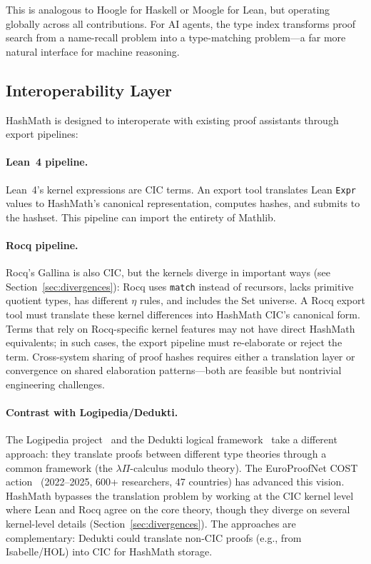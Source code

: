 \documentclass[11pt]{article}
\theoremstyle{definition}
\theoremstyle{plain}
\theoremstyle{remark}
\begin{document}
This is analogous to Hoogle for Haskell or Moogle for Lean, but operating globally across
all contributions.
For AI agents, the type index transforms proof search from a name-recall problem into a
type-matching problem---a far more natural interface for machine reasoning.

\subsection{Interoperability Layer}
\label{sec:interop}

HashMath is designed to interoperate with existing proof assistants through export pipelines:

\paragraph{Lean~4 pipeline.}
Lean~4's kernel expressions are CIC terms.
An export tool translates Lean \texttt{Expr} values to HashMath's canonical representation,
computes hashes, and submits to the hashset.
This pipeline can import the entirety of Mathlib.

\paragraph{Rocq pipeline.}
Rocq's Gallina is also CIC, but the kernels diverge in important ways
(see Section~\ref{sec:divergences}): Rocq uses \texttt{match} instead of recursors,
lacks primitive quotient types, has different $\eta$ rules, and includes
the \textsf{Set} universe.
A Rocq export tool must translate these kernel differences into HashMath CIC's
canonical form.
Terms that rely on Rocq-specific kernel features may not have direct HashMath equivalents;
in such cases, the export pipeline must re-elaborate or reject the term.
Cross-system sharing of proof hashes requires either a translation layer or
convergence on shared elaboration patterns---both are feasible but nontrivial
engineering challenges.

\paragraph{Contrast with Logipedia/Dedukti.}
The Logipedia project~\cite{logipedia} and the Dedukti logical framework~\cite{dedukti}
take a different approach: they translate proofs between different type theories through a common
framework (the $\lambda\Pi$-calculus modulo theory).
The EuroProofNet COST action~\cite{europroofnet} (2022--2025, 600+ researchers, 47 countries)
has advanced this vision.
HashMath bypasses the translation problem by working at the CIC kernel level where Lean and
Rocq agree on the core theory, though they diverge on several kernel-level details
(Section~\ref{sec:divergences}).
The approaches are complementary: Dedukti could translate non-CIC proofs (e.g., from
Isabelle/HOL) into CIC for HashMath storage.
\end{document}
